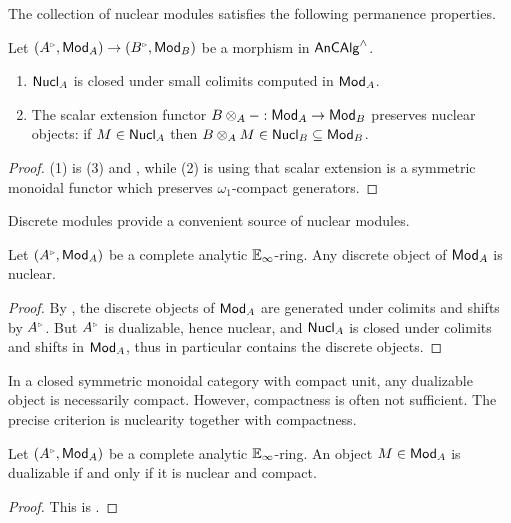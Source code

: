 The collection of nuclear modules satisfies the following permanence properties. 
\begin{proposition}\label{prop: permanence properties of nuclear objects}
    Let $(A^{\tri},\Mod_{A})\to(B^{\tri},\Mod_{B})$ be a morphism in $\mathsf{An}\mathsf{CAlg}^{\wedge}$.
    \begin{enumerate}
        \item $\mathsf{Nucl}_{A}$ is closed under small colimits computed in $\mathsf{Mod}_{A}$. 
        \item The scalar extension functor $B\otimes_{A}-:\mathsf{Mod}_{A}\to\mathsf{Mod}_{B}$ preserves nuclear objects: if $M\in\mathsf{Nucl}_{A}$ then $B\otimes_{A}M\in\mathsf{Nucl}_{B}\subseteq\mathsf{Mod}_{B}$. 
    \end{enumerate}
\end{proposition}
\begin{proof}
    (1) is  (3) and , while (2) is  using that scalar extension is a symmetric monoidal functor which preserves $\omega_{1}$-compact generators.  
\end{proof}
Discrete modules provide a convenient source of nuclear modules.
\begin{corollary}\label{cor: discrete implies nuclear}
    Let $(A^{\tri},\Mod_{A})$ be a complete analytic $\mathbb{E}_{\infty}$-ring. Any discrete object of $\mathsf{Mod}_{A}$ is nuclear.
\end{corollary}
\begin{proof}
    By , the discrete objects of $\mathsf{Mod}_{A}$ are generated under colimits and shifts by $A^{\tri}$. But $A^{\tri}$ is dualizable, hence nuclear, and $\mathsf{Nucl}_{A}$ is closed under colimits and shifts in $\mathsf{Mod}_{A}$, thus in particular contains the discrete objects.  
\end{proof}
In a closed symmetric monoidal category with compact unit, any dualizable object is necessarily compact. However, compactness is often not sufficient. The precise criterion is nuclearity together with compactness.
\begin{proposition}\label{prop: dualizable iff nuclear and compact}
    Let $(A^{\tri},\Mod_{A})$ be a complete analytic $\mathbb{E}_{\infty}$-ring. An object $M\in\mathsf{Mod}_{A}$ is dualizable if and only if it is nuclear and compact. 
\end{proposition}
\begin{proof}
    This is . 
\end{proof}
